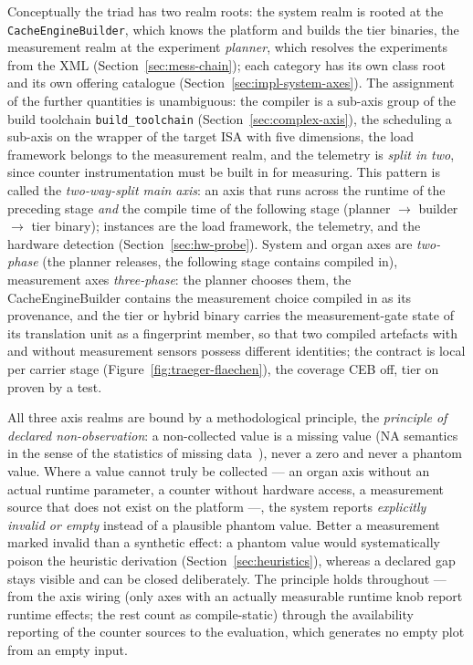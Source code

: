 \begin{nurkurz}
Conceptually the triad has two realm roots: the system realm is rooted at the \texttt{CacheEngineBuilder},
which knows the platform and builds the tier binaries, the measurement realm at the experiment
\emph{planner}, which resolves the experiments from the XML (Section~\ref{sec:mess-chain}); each category
has its own class root and its own offering catalogue (Section~\ref{sec:impl-system-axes}). The assignment
of the further quantities is unambiguous: the compiler is a sub-axis group of the build toolchain
\texttt{build\_toolchain} (Section~\ref{sec:complex-axis}), the scheduling a sub-axis on the wrapper of
the target ISA with five dimensions, the load framework belongs to the measurement realm, and the
telemetry is \emph{split in two}, since counter instrumentation must be built in for measuring. This
pattern is called the \emph{two-way-split main axis}: an axis that runs across the runtime of the
preceding stage \emph{and} the compile time of the following stage (planner $\to$ builder $\to$ tier
binary); instances are the load framework, the telemetry, and the hardware detection
(Section~\ref{sec:hw-probe}). System and organ axes are \emph{two-phase} (the planner releases, the
following stage contains compiled in), measurement axes \emph{three-phase}: the planner chooses them, the
CacheEngineBuilder contains the measurement choice compiled in as its provenance, and the tier or hybrid
binary carries the measurement-gate state of its translation unit as a fingerprint member, so that two
compiled artefacts with and without measurement sensors possess different identities; the contract is
local per carrier stage (Figure~\ref{fig:traeger-flaechen}), the coverage CEB off, tier on proven by a
test.
\end{nurkurz}

All three axis realms are bound by a methodological principle, the \emph{principle of declared
non-observation}: a non-collected value is a missing value (NA semantics in the sense of the statistics
of missing data~\cite{rubin1976missing}), never a zero and never a phantom value. Where a value cannot
truly be collected --- an organ axis without an actual runtime parameter, a counter without
hardware access, a measurement source that does not exist on the platform ---, the system reports
\emph{explicitly invalid or empty} instead of a plausible phantom value. Better a measurement marked
invalid than a synthetic effect: a phantom value would systematically poison the heuristic derivation
(Section~\ref{sec:heuristics}), whereas a declared gap stays visible
and can be closed deliberately. The principle holds throughout --- from the axis wiring (only
axes with an actually measurable runtime knob report runtime effects; the rest count as
compile-static) through the availability reporting of the counter sources to the evaluation, which generates
no empty plot from an empty input.

